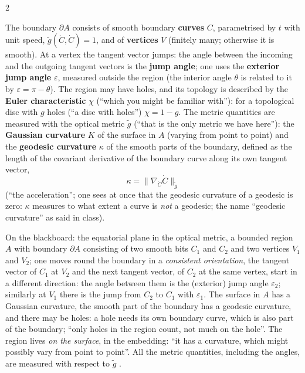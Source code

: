 \begin{paracol}{2}
\begin{definition}\label{def:c17-gbdata}
The boundary $\partial A$ consists of smooth boundary \textbf{curves} $C$, parametrised by $t$ with unit speed, $\tilde g(\dot C,\dot C)=1$, and of \textbf{vertices} $V$ (finitely many; otherwise it is smooth). At a vertex the tangent vector jumps: the angle between the incoming and the outgoing tangent vectors is the \textbf{jump angle}; one uses the \textbf{exterior jump angle} $\varepsilon$, measured outside the region (the interior angle $\theta$ is related to it by $\varepsilon=\pi-\theta$). The region may have holes, and its topology is described by the \textbf{Euler characteristic} $\chi$ (``which you might be familiar with''): for a topological disc with $g$ holes (``a disc with holes'') $\chi=1-g$. The metric quantities are measured with the optical metric $\tilde g$ (``that is the only metric we have here''): the \textbf{Gaussian curvature} $K$ of the surface in $A$ (varying from point to point) and the \textbf{geodesic curvature} $\kappa$ of the smooth parts of the boundary, defined as the length of the covariant derivative of the boundary curve along its own tangent vector,
\[
  \kappa=\bigl\lVert\nabla_{\dot C}\dot C\bigr\rVert_{\tilde g}
\]
(``the acceleration''; one sees at once that the geodesic curvature of a geodesic is zero: $\kappa$ measures to what extent a curve is \emph{not} a geodesic; the name ``geodesic curvature'' as said in class).
\end{definition}
\begin{coursenote}
On the blackboard: the equatorial plane in the optical metric, a bounded region $A$ with boundary $\partial A$ consisting of two smooth bits $C_1$ and $C_2$ and two vertices $V_1$ and $V_2$; one moves round the boundary in a \emph{consistent orientation}, the tangent vector of $C_1$ at $V_2$ and the next tangent vector, of $C_2$ at the same vertex, start in a different direction: the angle between them is the (exterior) jump angle $\varepsilon_2$; similarly at $V_1$ there is the jump from $C_2$ to $C_1$ with $\varepsilon_1$. The surface in $A$ has a Gaussian curvature, the smooth part of the boundary has a geodesic curvature, and there may be holes: a hole needs its own boundary curve, which is also part of the boundary; ``only holes in the region count, not much on the hole''. The region lives \emph{on the surface}, in the embedding: ``it has a curvature, which might possibly vary from point to point''. All the metric quantities, including the angles, are measured with respect to $\tilde g$ .
\end{coursenote}


\end{paracol}
